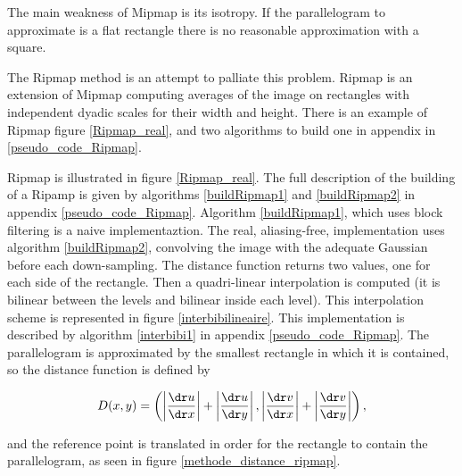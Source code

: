 \label{Ripmap}

The main weakness of Mipmap is its isotropy. If the parallelogram to approximate is a flat rectangle there is no reasonable approximation with a square.

The Ripmap method \cite{akenine2008real} is an attempt to  palliate this problem. Ripmap is an extension of Mipmap computing averages of the image on rectangles with independent dyadic scales for their width and height. There is an example of Ripmap figure \ref{Ripmap_real}, and two algorithms to build one in appendix in \ref{pseudo_code_Ripmap}. 

Ripmap is illustrated in figure \ref{Ripmap_real}. The full description of the building of a Ripamp is given by algorithms \ref{buildRipmap1} and \ref{buildRipmap2} in appendix \ref{pseudo_code_Ripmap}. Algorithm \ref{buildRipmap1}, which  uses block filtering is a naive implementaztion. The real, aliasing-free, implementation uses algorithm \ref{buildRipmap2}, convolving the image with the adequate Gaussian before each down-sampling. The distance function returns two values, one for each side of the rectangle. Then a quadri-linear interpolation is computed (it is bilinear between the levels and bilinear inside each level). This interpolation scheme is represented in figure \ref{interbibilineaire}. This implementation is described by algorithm \ref{interbibi1} in appendix \ref{pseudo_code_Ripmap}. The parallelogram is approximated by the smallest rectangle in which it is contained, so the distance function is defined by

$$D(x,y) = \left( \left|\frac{\dr u}{\dr x}\right|+\left|\frac{\dr u}{\dr y}\right|,\left|\frac{\dr v}{\dr x}\right|+\left|\frac{\dr v}{\dr y}\right|\right),$$

\noindent and the reference point is translated in order for the rectangle to contain the parallelogram, as seen in figure \ref{methode_distance_ripmap}.




